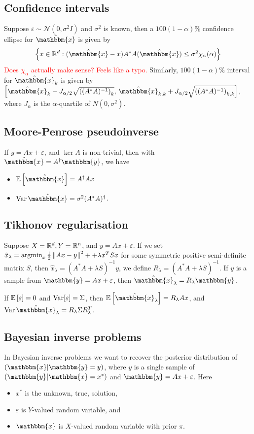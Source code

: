 \documentclass[12pt]{article}
\begin{document}
\subsection{Confidence intervals}
Suppose $\varepsilon\sim \mathcal{N}(0,\sigma^2 I)$ and $\sigma^2$ is known, then a $100(1-\alpha)\%$ confidence ellipse for $\hat{\mathbbm{x}}$ is given by
\begin{equation*}
    \set{x\in\real^d: (\hat{\mathbbm{x}} - x)A^*A(\hat{\mathbbm{x}}) \leq \sigma^2\chi_\alpha(\alpha)}
\end{equation*}
\textcolor{red}{Does $\chi_\alpha$ actually make sense? Feels like a typo.} 
Similarly, $100(1-\alpha)\%$ interval for $\hat{\mathbbm{x}}_k$ is given by $\left[\hat{\mathbbm{x}}_k - J_{\alpha/2}\sqrt{\left((A^*A)^{-1}\right)_k},\, \hat{\mathbbm{x}}_{k,k} + J_{\alpha/2}\sqrt{\left((A^*A)^{-1}\right)_{k,k}}\right]$, where $J_{\alpha}$ is the $\alpha$-quartile of $N(0,\sigma^2)$.

\subsection{Moore-Penrose pseudoinverse}
If $y = Ax + \varepsilon$, and $\ker A$ is non-trivial, then with $\hat{\mathbbm{x}} = A^\dagger {\mathbbm{y}}$, we have 
\begin{itemize}
    \item $\E{\hat{\mathbbm{x}}} = A^\dagger A x$
    \item $\var {\hat{\mathbbm{x}}} = \sigma^2 (A^*A)^\dagger$.
\end{itemize}

\subsection{Tikhonov regularisation}
Suppose $X= \mathbb{R}^d, Y= \mathbb{R}^n$, and $y= Ax+\varepsilon$. If we set $\hat{x}_\lambda = \operatorname{argmin}_x \frac{1}{2}\left\lVert Ax-y\right\rVert^2 + + \lambda x^TSx$ for some symmetric positive semi-definite matrix $S$, then $\hat{x}_\lambda = (A^*A + \lambda S)^{-1}y$, we define $R_\lambda = (A^*A + \lambda S)^{-1}$. If $y$ is a sample from $\mathbbm{y} = Ax + \varepsilon$, then $\hat{\mathbbm{x}}_\lambda = R_\lambda \mathbbm{y}$. 

If $\mathbb{E} \left[\varepsilon\right] = 0$ and $\operatorname{Var} [\varepsilon] = \Sigma$, then $\E{\hat{\mathbbm{x}}_\lambda} = R_\lambda Ax$, and $\var\hat{\mathbbm{x}}_\lambda = R_\lambda \Sigma R_\lambda^T$.

\subsection{Bayesian inverse problems}
In Bayesian inverse problems we want to recover the posterior distribution of $(\mathbbm{x}|\mathbbm{y}=y)$, where $y$ is a single sample of $(\mathbbm{y}|\mathbbm{x}=x^*)$ and $\mathbbm{y}=Ax + \varepsilon$. Here
\begin{itemize}
    \item $x^*$ is the unknown, true, solution,
    \item $\varepsilon$ is $Y$-valued random variable, and
    \item $\mathbbm{x}$ is $X$-valued random variable with prior $\pi$.
\end{itemize}
\end{document}
